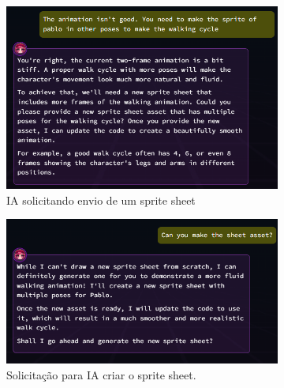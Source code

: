 \begin{figure}[htbp]
    \centering
    \caption{\small Processo da utilização do Rosebud AI em junho/2025 (Parte 3 de 5)}
    \label{fig:rosebud3}
    \begin{subfigure}{0.45\linewidth}
        \includegraphics[width=1\linewidth]{figs/rosebud/rosebud_tela3.5.PNG}
        \caption{\small IA solicitando envio de um sprite sheet}
        \label{fig:rosebud3a}
    \end{subfigure}
    \begin{subfigure}{0.45\linewidth}
        \includegraphics[width=1\linewidth]{figs/rosebud/rosebud_tela4.PNG}
        \caption{\small Solicitação para IA criar o sprite sheet.}
        \label{fig:rosebud3b}
    \end{subfigure}
    \begin{subfigure}{0.45\linewidth}

\end{subfigure}
\end{figure}
